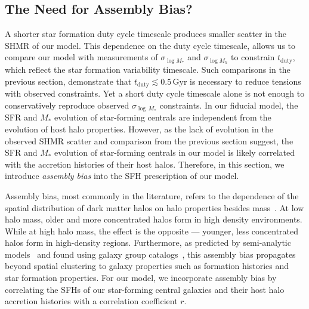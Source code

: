 \documentclass[12pt, letterpaper, preprint, tighten]{aastex62}
\begin{document}
\subsection{The Need for Assembly Bias?}
A shorter star formation duty cycle timescale produces smaller scatter in the 
SHMR of our model. This dependence on the duty cycle timescale, allows us to 
compare our model with measurements of $\sigma_{\log M_*}$ and 
$\sigma_{\log M_h}$ to constrain $t_\mathrm{duty}$, which reflect the star 
formation variability timescale. Such comparisons in the previous section, 
demonstrate that $t_\mathrm{duty} \lesssim 0.5\,\mathrm{Gyr}$ is necessary 
to reduce tensions with observed constraints. Yet a short duty cycle 
timescale alone is not enough to conservatively reproduce observed 
$\sigma_{\log\,M_*}$ constraints. In our fiducial model, the SFR and $M_*$ 
evolution of star-forming centrals are independent from the evolution of 
host halo properties. However, as the lack of evolution in the observed 
SHMR scatter and comparison from the previous section suggest, the SFR 
and $M_*$ evolution of star-forming centrals in our model is likely 
correlated with the accretion histories of their host halos. Therefore, in 
this section, we introduce \emph{assembly bias} into the SFH prescription 
of our model.

Assembly bias, most commonly in the literature, refers to the dependence of the 
spatial distribution of dark matter halos on halo properties besides 
mass~\citep{gao2005,wechsler2006,gao2007,wetzel2007,li2008,sunayama2016}.
At low halo mass, older and more concentrated halos form in high density environments. 
While at high halo mass, the effect is the opposite --- younger, less concentrated 
halos form in high-density regions. Furthermore, as predicted by semi-analytic 
models~\citep{croton2007} and found using galaxy group 
catalogs~\citep{yang2006,wang2008,tinker2011,wang2013,lacerna2014,tinker2017,tinker2017b,tinker2018},
this assembly bias propagates beyond spatial clustering to galaxy properties
such as formation histories and star formation properties. For our model, we 
incorporate assembly bias by correlating the SFHs of our star-forming central 
galaxies and their host halo accretion histories with a correlation 
coefficient $r$. 
\end{document}
